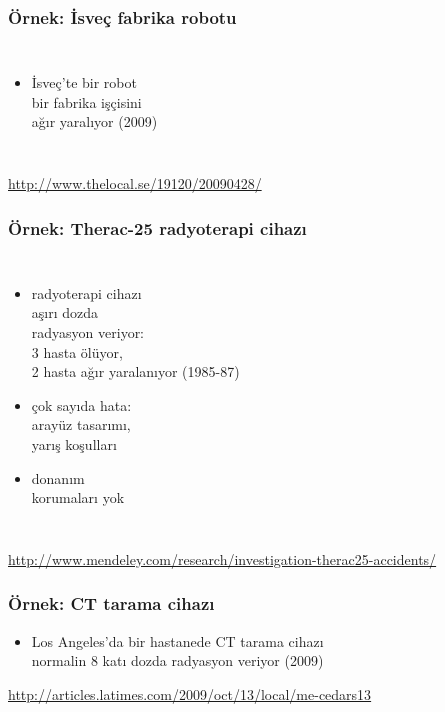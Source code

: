 \documentclass[dvipsnames]{beamer}
\theoremstyle{definition}
\theoremstyle{example}
\theoremstyle{plain}
\begin{document}
\begin{frame}
  \frametitle{Örnek: İsveç fabrika robotu}

  \begin{columns}

    \begin{itemize}
      \item İsveç'te bir robot\\
        bir fabrika işçisini\\
        ağır yaralıyor (2009)
    \end{itemize}
  \end{columns}

  \medskip
  \tiny{\url{http://www.thelocal.se/19120/20090428/}}\\
\end{frame}

\begin{frame}
  \frametitle{Örnek: Therac-25 radyoterapi cihazı}

  \begin{columns}

    \begin{itemize}
      \item radyoterapi cihazı\\
        aşırı dozda\\
        radyasyon veriyor:\\
        3 hasta ölüyor,\\
        2 hasta ağır yaralanıyor (1985-87)

      \item çok sayıda hata:\\
        arayüz tasarımı,\\
        yarış koşulları
      \item donanım\\
        korumaları yok
    \end{itemize}
  \end{columns}

  \medskip
  \tiny{\url{http://www.mendeley.com/research/investigation-therac25-accidents/}}\\
\end{frame}

\begin{frame}
  \frametitle{Örnek: CT tarama cihazı}

  \begin{center}
  \end{center}

  \begin{itemize}
    \item Los Angeles'da bir hastanede CT tarama cihazı\\
      normalin 8 katı dozda radyasyon veriyor (2009)
  \end{itemize}

  \medskip
  \tiny{\url{http://articles.latimes.com/2009/oct/13/local/me-cedars13}}\\
\end{frame}
\end{document}
